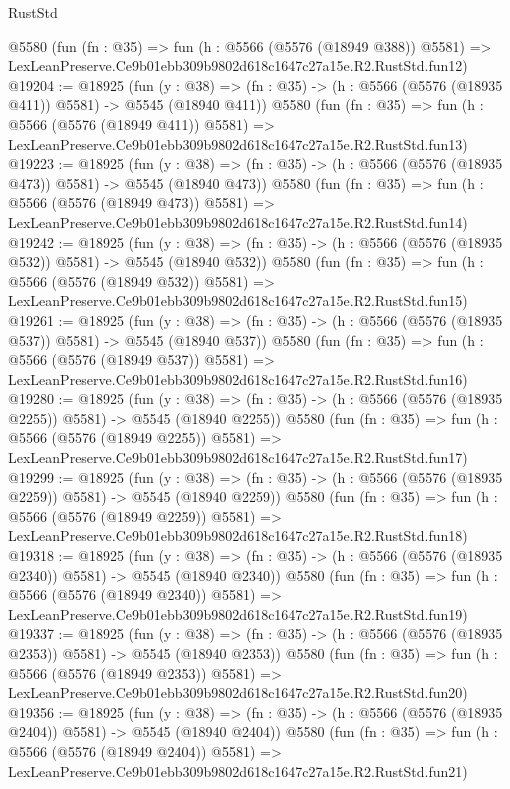 \begin{lexlean}{RustStd}
\begin{coremodule}
    @5580
    (fun (fn : @35) =>
    fun (h : @5566 (@5576 (@18949 @388)) @5581) =>
    LexLeanPreserve.Ce9b01ebb309b9802d618c1647c27a15e.R2.RustStd.fun12)
@19204 := @18925
    (fun (y : @38) => (fn : @35) -> (h : @5566 (@5576 (@18935 @411)) @5581) -> @5545 (@18940 @411))
    @5580
    (fun (fn : @35) =>
    fun (h : @5566 (@5576 (@18949 @411)) @5581) =>
    LexLeanPreserve.Ce9b01ebb309b9802d618c1647c27a15e.R2.RustStd.fun13)
@19223 := @18925
    (fun (y : @38) => (fn : @35) -> (h : @5566 (@5576 (@18935 @473)) @5581) -> @5545 (@18940 @473))
    @5580
    (fun (fn : @35) =>
    fun (h : @5566 (@5576 (@18949 @473)) @5581) =>
    LexLeanPreserve.Ce9b01ebb309b9802d618c1647c27a15e.R2.RustStd.fun14)
@19242 := @18925
    (fun (y : @38) => (fn : @35) -> (h : @5566 (@5576 (@18935 @532)) @5581) -> @5545 (@18940 @532))
    @5580
    (fun (fn : @35) =>
    fun (h : @5566 (@5576 (@18949 @532)) @5581) =>
    LexLeanPreserve.Ce9b01ebb309b9802d618c1647c27a15e.R2.RustStd.fun15)
@19261 := @18925
    (fun (y : @38) => (fn : @35) -> (h : @5566 (@5576 (@18935 @537)) @5581) -> @5545 (@18940 @537))
    @5580
    (fun (fn : @35) =>
    fun (h : @5566 (@5576 (@18949 @537)) @5581) =>
    LexLeanPreserve.Ce9b01ebb309b9802d618c1647c27a15e.R2.RustStd.fun16)
@19280 := @18925
    (fun (y : @38) =>
    (fn : @35) -> (h : @5566 (@5576 (@18935 @2255)) @5581) -> @5545 (@18940 @2255))
    @5580
    (fun (fn : @35) =>
    fun (h : @5566 (@5576 (@18949 @2255)) @5581) =>
    LexLeanPreserve.Ce9b01ebb309b9802d618c1647c27a15e.R2.RustStd.fun17)
@19299 := @18925
    (fun (y : @38) =>
    (fn : @35) -> (h : @5566 (@5576 (@18935 @2259)) @5581) -> @5545 (@18940 @2259))
    @5580
    (fun (fn : @35) =>
    fun (h : @5566 (@5576 (@18949 @2259)) @5581) =>
    LexLeanPreserve.Ce9b01ebb309b9802d618c1647c27a15e.R2.RustStd.fun18)
@19318 := @18925
    (fun (y : @38) =>
    (fn : @35) -> (h : @5566 (@5576 (@18935 @2340)) @5581) -> @5545 (@18940 @2340))
    @5580
    (fun (fn : @35) =>
    fun (h : @5566 (@5576 (@18949 @2340)) @5581) =>
    LexLeanPreserve.Ce9b01ebb309b9802d618c1647c27a15e.R2.RustStd.fun19)
@19337 := @18925
    (fun (y : @38) =>
    (fn : @35) -> (h : @5566 (@5576 (@18935 @2353)) @5581) -> @5545 (@18940 @2353))
    @5580
    (fun (fn : @35) =>
    fun (h : @5566 (@5576 (@18949 @2353)) @5581) =>
    LexLeanPreserve.Ce9b01ebb309b9802d618c1647c27a15e.R2.RustStd.fun20)
@19356 := @18925
    (fun (y : @38) =>
    (fn : @35) -> (h : @5566 (@5576 (@18935 @2404)) @5581) -> @5545 (@18940 @2404))
    @5580
    (fun (fn : @35) =>
    fun (h : @5566 (@5576 (@18949 @2404)) @5581) =>
    LexLeanPreserve.Ce9b01ebb309b9802d618c1647c27a15e.R2.RustStd.fun21)

\end{coremodule}
\end{lexlean}

